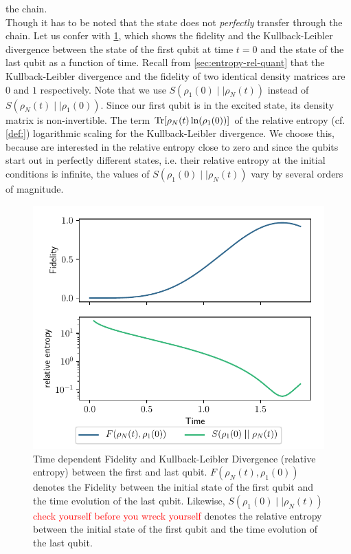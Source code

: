 \documentclass{book}
\numberwithin{equation}{section} %
\begin{document}
the chain.\\ Though it has to be noted that the state does not \emph{perfectly} transfer through the chain.
Let us confer with \cref{fig:hom_fide}, which shows the fidelity and the Kullback-Leibler divergence between
the state of the first qubit at time $t=0$ and the state of the last qubit as a function of time.
Recall from \cref{sec:entropy-rel-quant} that the Kullback-Leibler divergence and the fidelity of two
identical density matrices are $0$ and $1$ respectively.
Note that we use $S(\rho_1(0)\mid\mid\rho_N(t))$ instead of $S(\rho_N(t)\mid\mid\rho_1(0))$. Since our first qubit is in the excited state,
its density matrix is non-invertible. The term $\Trace[\rho_N(t)\ln(\rho_1(0))]$ of the relative entropy (cf. \cref{def:}) 
logarithmic scaling for the Kullback-Leibler divergence. We choose this, because are interested in the
relative entropy close to zero and since the qubits start out in perfectly different states, i.e. their relative entropy at the initial conditions is infinite,
the values of $S(\rho_1(0)\mid\mid\rho_N(t))$ vary by several orders of magnitude.
\begin{figure}[h!]
    \centering
    \includegraphics{alltheplots/j_const/fidelity_kld_fixed_legend.pdf}
    \caption{Time dependent Fidelity and Kullback-Leibler Divergence (relative entropy) between the first and last qubit.
    $F(\rho_N(t), \rho_1(0))$ denotes the Fidelity between the initial state of the first qubit and the time evolution of the last qubit.
    Likewise, $S(\rho_1(0)\mid\mid\rho_N(t))$ \textcolor{red}{check yourself before you wreck yourself} denotes the relative entropy between the initial state of the first qubit and the time evolution of the last qubit.}
    \label{fig:hom_fide}
\end{figure}\\
\end{document}
